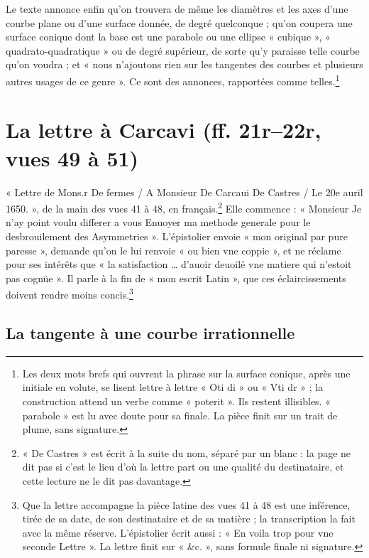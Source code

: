 \documentclass[11pt,a4paper]{article}
\begin{document}
Le texte annonce enfin qu'on trouvera de même les diamètres et les axes d'une
courbe plane ou d'une surface donnée, de degré quelconque ; qu'on coupera une
surface conique dont la base est une parabole ou une ellipse « cubique »,
« quadrato-quadratique » ou de degré supérieur, de sorte qu'y paraisse telle
courbe qu'on voudra ; et « nous n'ajoutons rien sur les tangentes des courbes
et plusieurs autres usages de ce genre ». Ce sont des annonces, rapportées
comme telles.\footnote{Les deux mots brefs qui ouvrent la phrase sur la
surface conique, après une initiale en volute, se lisent lettre à lettre
« Oti di » ou « Vti dr » ; la construction attend un verbe comme « poterit ».
Ils restent illisibles. « parabole » est lu avec doute pour sa finale. La pièce
finit sur un trait de plume, sans signature.}

\section*{La lettre à Carcavi (ff. 21r–22r, vues 49 à 51)}

« Lettre de Mons.r De fermes / A Monsieur De Carcaui De Castres / Le 20e auril
1650. », de la main des vues 41 à 48, en français.\footnote{« De Castres » est
écrit à la suite du nom, séparé par un blanc : la page ne dit pas si c'est le
lieu d'où la lettre part ou une qualité du destinataire, et cette lecture ne
le dit pas davantage.} Elle commence : « Monsieur Je n'ay point voulu differer
a vous Enuoyer ma methode generale pour le desbrouilement des Asymmetries ».
L'épistolier envoie « mon original par pure paresse », demande qu'on le lui
renvoie « ou bien vne coppie », et ne réclame pour ses intérêts que « la
satisfaction … d'auoir deuoilé vne matiere qui n'estoit pas cognüe ». Il parle
à la fin de « mon escrit Latin », que ces éclaircissements doivent rendre moins
concis.\footnote{Que la lettre accompagne la pièce latine des vues 41 à 48 est
une inférence, tirée de sa date, de son destinataire et de sa matière ; la
transcription la fait avec la même réserve. L'épistolier écrit aussi : « En
voila trop pour vne seconde Lettre ». La lettre finit sur « \&c. », sans
formule finale ni signature.}

\subsection*{La tangente à une courbe irrationnelle}
\end{document}
